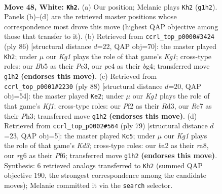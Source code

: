 \documentclass[11pt]{article}
\begin{document}
\clearpage

\begin{figure}[p]\centering
\begin{subfigure}{0.46\textwidth}\centering
\resizebox{\linewidth}{!}{%
\newchessgame
\chessboard[
  setfen={7k/4R3/6r1/1B6/4p2p/4Bp1P/b4P2/6K1 w - - 6 48},
  showmover=false,
  pgfstyle=straightmove, color=movearrow, markmove={g1-h2}
]}
\caption{}
\end{subfigure}\hfill
\begin{subfigure}{0.46\textwidth}\centering
\resizebox{\linewidth}{!}{%
\newchessgame
\chessboard[
  setfen={4k3/8/8/p2p3p/P2B1Rb1/2P5/6P1/1r4K1 w - - 4 44},
  showmover=false,
  pgfstyle=straightmove, color=movearrow, markmove={g1-h2}
]}
\caption{}
\end{subfigure}
\\[4pt]
\begin{subfigure}{0.46\textwidth}\centering
\resizebox{\linewidth}{!}{%
\newchessgame
\chessboard[
  setfen={7k/8/6p1/3B3p/p2bP3/3R3P/P7/1r3K2 w - - 6 45},
  showmover=false,
  pgfstyle=straightmove, color=movearrow, markmove={f1-e2}
]}
\caption{}
\end{subfigure}\hfill
\begin{subfigure}{0.46\textwidth}\centering
\resizebox{\linewidth}{!}{%
\newchessgame
\chessboard[
  setfen={R7/8/3k1p1p/3p4/2b2PPP/5B2/1r6/6K1 b - - 6 40},
  showmover=false,
  pgfstyle=straightmove, color=movearrow, markmove={d6-c5}
]}
\caption{}
\end{subfigure}
\caption{\textbf{Move 48, White: \texttt{Kh2}.} (a) Our position; Melanie plays \texttt{Kh2} (\texttt{g1h2}). Panels (b)--(d) are the retrieved master positions whose correspondence most drove this move (highest QAP objective among those that transfer to it). (b) Retrieved from \texttt{ccrl\_top\_p0000\#3424} (ply 86) [structural distance $d$=22, QAP obj=70]: the master played \texttt{Kh2}; under $\mu$ our \emph{Kg1} plays the role of that game's \emph{Kg1}; cross-type roles: our \emph{B}b5 as their \emph{P}c3, our \emph{p}e4 as their \emph{b}g4; transferred move \texttt{g1h2} \textbf{(endorses this move)}. (c) Retrieved from \texttt{ccrl\_top\_p0001\#2230} (ply 88) [structural distance $d$=20, QAP obj=54]: the master played \texttt{Ke2}; under $\mu$ our \emph{Kg1} plays the role of that game's \emph{Kf1}; cross-type roles: our \emph{P}f2 as their \emph{R}d3, our \emph{R}e7 as their \emph{P}h3; transferred move \texttt{g1h2} \textbf{(endorses this move)}. (d) Retrieved from \texttt{ccrl\_top\_p0002\#564} (ply 79) [structural distance $d$=23, QAP obj=5]: the master played \texttt{Kc5}; under $\mu$ our \emph{Kg1} plays the role of that game's \emph{Kd3}; cross-type roles: our \emph{b}a2 as their \emph{r}a8, our \emph{r}g6 as their \emph{P}f6; transferred move \texttt{g1h2} \textbf{(endorses this move)}. Synthesis: 6 retrieved analogs transferred to \texttt{Kh2} (summed QAP objective 190, the strongest correspondence among the candidate moves); Melanie committed it via the \texttt{search} selector.}
\label{fig:thought-m94}
\end{figure}
\end{document}
